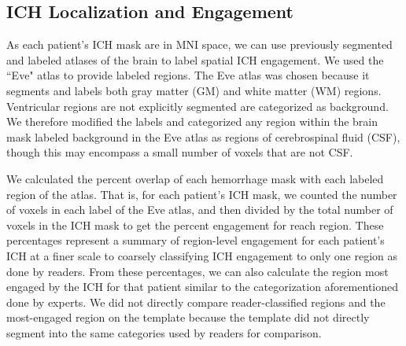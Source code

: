 \documentclass[10pt]{article}\usepackage[]{graphicx}\usepackage[]{color}
\begin{document}
\subsection*{ICH Localization and Engagement}
\label{sec:engage}
As each patient's ICH mask are in MNI space, we can use previously segmented and labeled atlases of the brain to label spatial ICH engagement.  
We used the ``Eve" atlas \citep{oishi_human_2008} to provide labeled regions. The Eve atlas was chosen because it segments and labels both gray matter (GM) and white matter (WM) regions.  Ventricular regions are not explicitly segmented are categorized as background.  We therefore modified the labels and categorized any region within the brain mask labeled background in the Eve atlas as regions of cerebrospinal fluid (CSF), though this may encompass a small number of voxels that are not CSF.  

We calculated the percent overlap of each hemorrhage mask with each labeled region of the atlas.  That is, for each patient's ICH mask, we counted the number of voxels in each label of the Eve atlas, and then divided by the total number of voxels in the ICH mask to get the percent engagement for reach region. These percentages represent a summary of region-level engagement for each patient's ICH at a finer scale to coarsely classifying ICH engagement to only one region as done by readers.  From these percentages, we can also calculate the region most engaged by the ICH for that patient similar to the categorization aforementioned done by experts.  We did not directly compare reader-classified regions and the most-engaged region on the template because the template did not directly segment into the same categories used by readers for comparison.
\end{document}
